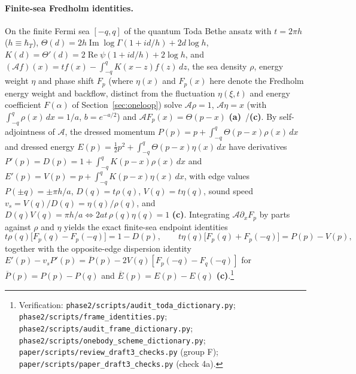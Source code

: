 \documentclass[11pt,a4paper]{article}
\newcommand{\lab}[1]{{\normalfont\sffamily\footnotesize\bfseries(#1)}}
\newcommand{\La}{\lab{a}}
\newcommand{\Lc}{\lab{c}}
\newcommand{\scr}[1]{\nolinkurl{#1}}
\newcommand{\chk}[1]{\footnote{\raggedright Verification: #1.}}
\newcommand{\hb}{\hbar}
\theoremstyle{remark}
\begin{document}
\paragraph{Finite-sea Fredholm identities.} On the finite Fermi sea $[-q,q]$ of the quantum Toda Bethe ansatz with $t=2\pi h$ ($h\equiv\hb_T$), $\Theta(d)=2h\operatorname{Im}\log\Gamma(1+id/h)+2d\log h$, $K(d)=\Theta'(d)=2\operatorname{Re}\psi(1+id/h)+2\log h$, and $(\mathcal Af)(x)=tf(x)-\int_{-q}^qK(x-z)f(z)\,dz$, the sea density $\rho$, energy weight $\eta$ and phase shift $F_p$ (where $\eta(x)$ and $F_p(x)$ here denote the Fredholm energy weight and backflow, distinct from the fluctuation $\eta(\xi,t)$ and energy coefficient $F(\alpha)$ of Section~\ref{sec:oneloop}) solve $\mathcal A\rho=1$, $\mathcal A\eta=x$ (with $\int_{-q}^q\rho(x)\,dx=1/a$, $b=e^{-a/2}$) and $\mathcal AF_p(x)=\Theta(p-x)$ \La~\cite{Mertens,PM}/\Lc. By self-adjointness of $\mathcal A$, the dressed momentum $P(p)=p+\int_{-q}^q\Theta(p-x)\rho(x)\,dx$ and dressed energy $E(p)=\tfrac12p^2+\int_{-q}^q\Theta(p-x)\eta(x)\,dx$ have derivatives $P'(p)=D(p)=1+\int_{-q}^qK(p-x)\rho(x)\,dx$ and $E'(p)=V(p)=p+\int_{-q}^qK(p-x)\eta(x)\,dx$, with edge values $P(\pm q)=\pm\pi h/a$, $D(q)=t\rho(q)$, $V(q)=t\eta(q)$, sound speed $v_s=V(q)/D(q)=\eta(q)/\rho(q)$, and $D(q)V(q)=\pi h/a\Longleftrightarrow 2at\,\rho(q)\eta(q)=1$ \Lc. Integrating $\mathcal A\partial_xF_p$ by parts against $\rho$ and $\eta$ yields the exact finite-sea endpoint identities
\begin{equation}\label{eq:endids}
t\rho(q)\big[F_p(q)-F_p(-q)\big]=1-D(p),\qquad
t\eta(q)\big[F_p(q)+F_p(-q)\big]=P(p)-V(p),
\end{equation}
together with the opposite-edge dispersion identity $E'(p)-v_sP'(p)=\overline P(p)-2V(q)[F_p(-q)-F_q(-q)]$ for $\overline P(p)=P(p)-P(q)$ and $\overline E(p)=E(p)-E(q)$ \Lc.\chk{\scr{phase2/scripts/audit_toda_dictionary.py}; \scr{phase2/scripts/frame_identities.py}; \scr{phase2/scripts/audit_frame_dictionary.py}; \scr{phase2/scripts/onebody_scheme_dictionary.py}; \scr{paper/scripts/review_draft3_checks.py} (group F); \scr{paper/scripts/paper_draft3_checks.py} (check 4a)}
\end{document}
